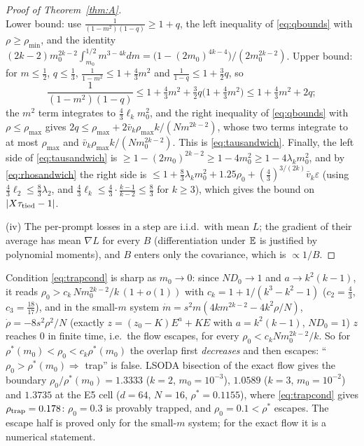 \begin{proof}[Proof of Theorem~\ref{thm:A}]
\[\]
Lower bound: use $\frac1{(1-m^2)(1-q)}\ge1+q$, the left inequality of \eqref{eq:qbounds} with $\rho\ge\rho_{\min}$, and the identity
$(2k-2)m_0^{2k-2}\int_{m_0}^{1/2}m^{3-4k}dm=\big(1-(2m_0)^{4k-4}\big)/(2m_0^{2k-2})$. Upper bound: for $m\le\frac12$, $q\le\frac13$,
$\frac1{1-m^2}\le1+\frac43m^2$ and $\frac1{1-q}\le1+\frac32q$, so
\[
\frac1{(1-m^2)(1-q)}\le1+\tfrac43m^2+\tfrac32q\big(1+\tfrac43m^2\big)\le1+\tfrac43m^2+2q ;
\]
the $m^2$ term integrates to $\frac43\ell_km_0^2$, and the right inequality of \eqref{eq:qbounds} with $\rho\le\rho_{\max}$ gives $2q\le\rho_{\max}+2\bar v_k\rho_{\max}k/(Nm^{2k-2})$,
whose two terms integrate to at most $\rho_{\max}$ and $\bar v_k\rho_{\max}k/(Nm_0^{2k-2})$. This is \eqref{eq:tausandwich}. Finally, the left side of
\eqref{eq:tausandwich} is $\ge1-(2m_0)^{2k-2}\ge1-4m_0^2\ge1-4\lambda_km_0^2$, and by \eqref{eq:rhosandwich} the right side is
$\le1+\frac83\lambda_km_0^2+1.25\rho_0+(\frac43)^{3/(2k)}\bar v_k\varepsilon$ (using $\frac43\ell_2\le\frac83\lambda_2$, and
$\frac43\ell_k\le\frac43\cdot\frac{k-1}{k-2}\le\frac83$ for $k\ge3$), which gives the bound on $|X\tau_{\rm tied}-1|$.

(iv) The per-prompt losses in a step are i.i.d.\ with mean $L$; the gradient of their average has mean $\nabla L$ for every $B$ (differentiation
under $\mathbb{E}$ is justified by polynomial moments), and $B$ enters only the covariance, which is $\propto1/B$.
\end{proof}

\begin{remark}\label{rem:ck}
Condition \eqref{eq:trapcond} is sharp as $m_0\to0$: since $ND_0\to1$ and $a\to k^2(k-1)$, it reads
$\rho_0>c_k\,Nm_0^{2k-2}/k\,(1+o(1))$ with $c_k=1+1/(k^3-k^2-1)$ ($c_2=\frac43$, $c_3=\frac{18}{17}$), and in the small-$m$ system
$\dot m=s^2m(4km^{2k-2}-4k^2\rho/N)$, $\dot\rho=-8s^2\rho^2/N$ (exactly $z=(z_0-K)E^a+KE$ with $a=k^2(k-1)$, $ND_0=1$) $z$ reaches $0$ in finite time, i.e.\ the flow escapes, for every $\rho_0<c_kNm_0^{2k-2}/k$.
So for $\rho^*(m_0)<\rho_0<c_k\rho^*(m_0)$ the overlap first \emph{decreases} and then escapes: ``$\rho_0>\rho^*(m_0)\Rightarrow$ trap'' is false. LSODA
bisection of the exact flow gives the boundary $\rho_0/\rho^*(m_0)=1.3333$ ($k{=}2$, $m_0{=}10^{-3}$), $1.0589$ ($k{=}3$, $m_0{=}10^{-2}$) and $1.3735$ at the E5
cell ($d{=}64$, $N{=}16$, $\rho^*=0.1155$), where \eqref{eq:trapcond} gives $\rho_{\rm trap}=0.178$: $\rho_0=0.3$ is provably trapped, and
$\rho_0=0.1<\rho^*$ escapes. The escape half is proved only for the
small-$m$ system; for the exact flow it is a numerical statement.
\end{remark}

